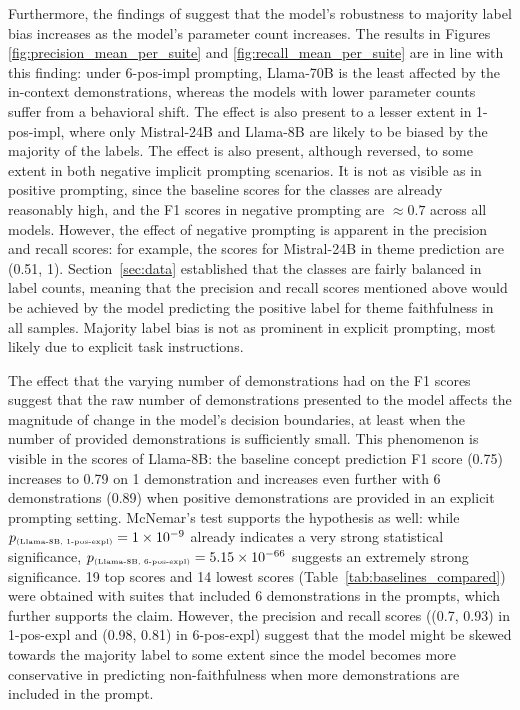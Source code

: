 \documentclass[english, 12pt, a4paper, sci, utf8, a-2b, online]{latex/definitions/aaltothesis}
\begin{document}
Furthermore, the findings of \textcite{gupta2023robustllmsincontextmajority} suggest that the model's robustness to majority label bias increases as the model's parameter count increases. The results in Figures \ref{fig:precision_mean_per_suite} and \ref{fig:recall_mean_per_suite} are in line with this finding: under 6-pos-impl prompting, Llama-70B is the least affected by the in-context demonstrations, whereas the models with lower parameter counts suffer from a behavioral shift. The effect is also present to a lesser extent in 1-pos-impl, where only Mistral-24B and Llama-8B are likely to be biased by the majority of the labels. The effect is also present, although reversed, to some extent in both negative implicit prompting scenarios. It is not as visible as in positive prompting, since the baseline scores for the classes are already reasonably high, and the F1 scores in negative prompting are $\approx 0.7$ across all models. However, the effect of negative prompting is apparent in the precision and recall scores: for example, the scores for Mistral-24B in theme prediction are (0.51, 1). Section~\ref{sec:data} established that the classes are fairly balanced in label counts, meaning that the precision and recall scores mentioned above would be achieved by the model predicting the positive label for theme faithfulness in all samples. Majority label bias is not as prominent in explicit prompting, most likely due to explicit task instructions.

The effect that the varying number of demonstrations had on the F1 scores suggest that the raw number of demonstrations presented to the model affects the magnitude of change in the model's decision boundaries, at least when the number of provided demonstrations is sufficiently small. This phenomenon is visible in the scores of Llama-8B: the baseline concept prediction F1 score (0.75) increases to 0.79 on 1 demonstration and increases even further with 6 demonstrations (0.89) when positive demonstrations are provided in an explicit prompting setting. McNemar's test supports the hypothesis as well: while $p_{\text{\tiny(Llama-8B, 1-pos-expl)}} = \num{1e-09}$ already indicates a very strong statistical significance, $p_{\text{\tiny(Llama-8B, 6-pos-expl)}} = \num{5.15e-66}$ suggests an extremely strong significance. 19 top scores and 14 lowest scores (Table~\ref{tab:baselines_compared}) were obtained with suites that included 6 demonstrations in the prompts, which further supports the claim. However, the precision and recall scores ((0.7, 0.93) in 1-pos-expl and (0.98, 0.81) in 6-pos-expl) suggest that the model might be skewed towards the majority label to some extent since the model becomes more conservative in predicting non-faithfulness when more demonstrations are included in the prompt. 
\end{document}
